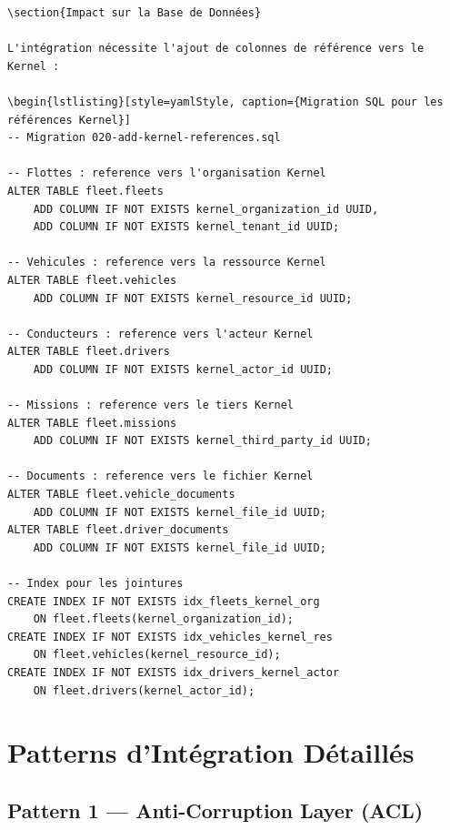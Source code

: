 \documentclass[12pt,a4paper]{report}
\begin{document}
\begin{lstlisting}[style=javaStyle, caption={Handler d'erreurs Kernel dans GlobalExceptionHandler}]
\section{Impact sur la Base de Données}

L'intégration nécessite l'ajout de colonnes de référence vers le Kernel :

\begin{lstlisting}[style=yamlStyle, caption={Migration SQL pour les références Kernel}]
-- Migration 020-add-kernel-references.sql

-- Flottes : reference vers l'organisation Kernel
ALTER TABLE fleet.fleets
    ADD COLUMN IF NOT EXISTS kernel_organization_id UUID,
    ADD COLUMN IF NOT EXISTS kernel_tenant_id UUID;

-- Vehicules : reference vers la ressource Kernel
ALTER TABLE fleet.vehicles
    ADD COLUMN IF NOT EXISTS kernel_resource_id UUID;

-- Conducteurs : reference vers l'acteur Kernel
ALTER TABLE fleet.drivers
    ADD COLUMN IF NOT EXISTS kernel_actor_id UUID;

-- Missions : reference vers le tiers Kernel
ALTER TABLE fleet.missions
    ADD COLUMN IF NOT EXISTS kernel_third_party_id UUID;

-- Documents : reference vers le fichier Kernel
ALTER TABLE fleet.vehicle_documents
    ADD COLUMN IF NOT EXISTS kernel_file_id UUID;
ALTER TABLE fleet.driver_documents
    ADD COLUMN IF NOT EXISTS kernel_file_id UUID;

-- Index pour les jointures
CREATE INDEX IF NOT EXISTS idx_fleets_kernel_org
    ON fleet.fleets(kernel_organization_id);
CREATE INDEX IF NOT EXISTS idx_vehicles_kernel_res
    ON fleet.vehicles(kernel_resource_id);
CREATE INDEX IF NOT EXISTS idx_drivers_kernel_actor
    ON fleet.drivers(kernel_actor_id);
\end{lstlisting}

\chapter{Patterns d'Intégration Détaillés}

\section{Pattern 1 — Anti-Corruption Layer (ACL)}
\end{document}
